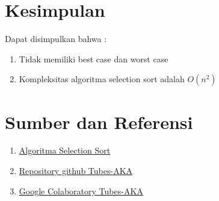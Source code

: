 \documentclass[12pt]{article}
\begin{document}
\section{Kesimpulan}
Dapat disimpulkan bahwa :
\begin{enumerate}
    \item Tidak memiliki best case dan worst case
    \item Kompleksitas algoritma selection sort adalah $O(n^2)$
\end{enumerate}
\section{Sumber dan Referensi}
\begin{enumerate}
    \item \href{https://www.techiedelight.com/selection-sort-iterative-recursive/}{Algoritma Selection Sort}
    \item \href{https://github.com/krobus00/Tubes-AKA}{Repository github Tubes-AKA}
    \item \href{https://colab.research.google.com/drive/1NBGprozO0wrKurCJ-q1EM0LyCBFzYKkK?usp=sharing}{Google Colaboratory Tubes-AKA}
\end{enumerate}
\end{document}
